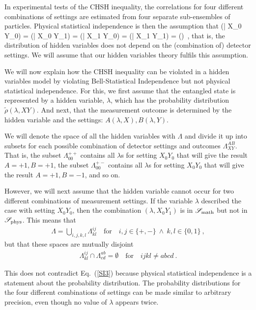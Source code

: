 \documentclass{article}
\makeatletter
\newcommand\be{\@ifstar{\[}{\begin{equation}}}
\newcommand\ee{\@ifstar{\]}{\end{equation}}}
\makeatother
\begin{document}
In experimental tests of the {\sc CHSH} inequality, the correlations for four different combinations of settings are estimated from four separate sub-ensembles of particles. 
Physical statistical independence is then the assumption that 
\be
\label{SI3}
\tilde \rho (\lambda | X_0 Y_0) = \tilde \rho(\lambda | X_0 Y_1) = \tilde \rho(\lambda | X_1 Y_0) = \tilde \rho(\lambda | X_1 Y_1) = \tilde \rho(\lambda)~,
\ee
that is, the distribution of hidden variables does not depend on the (combination of) detector settings. We will assume that our hidden variables theory fulfils this assumption.

We will now explain how the {\sc CHSH} inequality can be violated in a hidden variables model by violating Bell-Statistical Independence but not physical statistical independence. For this, we first assume that the entangled state is represented by a hidden variable, $\lambda$, which has the probability distribution $\tilde \rho(\lambda,XY)$. And next, that the measurement outcome is determined by the hidden variable and the settings: $A(\lambda,X), B(\lambda,Y)$.

We will denote the space of all the hidden variables with $\Lambda$ and divide it up into subsets for each possible combination of detector settings and outcomes $\Lambda_{XY}^{AB}$. That is, the subset $\Lambda^{++}_{00}$ contains all $\lambda$s for setting $X_0Y_0$ that will give the result $A=+1,B=+1$, the subset $\Lambda^{+-}_{00}$ contains all $\lambda$s for setting $X_0Y_0$ that will give the result $A=+1,B=-1$, and so on.

However, we will next assume that the hidden variable cannot occur for two different combinations of measurement settings. If the variable $\lambda$ described the case with setting $X_0Y_0$, then the combination $(\lambda,X_0Y_1)$ is in ${\mathscr S}_{\rm math}$ but not in ${\mathscr S}_{\rm phys}$. This means that 
\begin{eqnarray}
\Lambda = \bigcup_{i,j,k,l} \Lambda^{ij}_{kl}\quad \mbox{for} \quad i,j \in \{+,-\}~\wedge~k,l \in \{0,1\}~,
\end{eqnarray}
but that these spaces are mutually disjoint
\begin{eqnarray}
\Lambda^{ij}_{kl} \cap \Lambda^{ab}_{cd} = \emptyset \quad \mbox{for} \quad ijkl \neq abcd~.
\end{eqnarray}

This does not contradict Eq.\ (\ref{SI3}) because physical statistical independence is a statement about the probability distribution. The probability distributions for the four different combinations of settings can be made similar to arbitrary precision, even though no value of $\lambda$ appears twice. 
\end{document}
